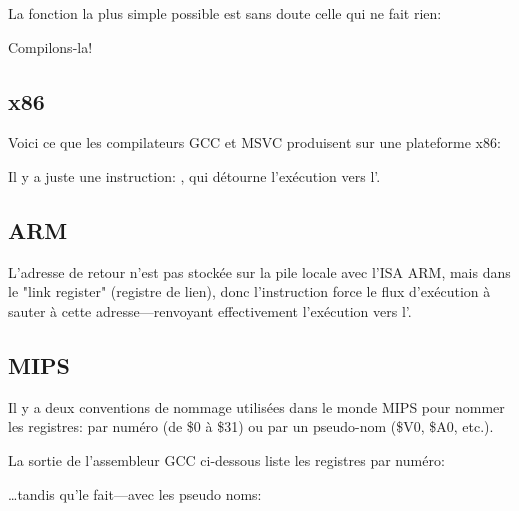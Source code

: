 ﻿
\label{empty_func}

La fonction la plus simple possible est sans doute celle qui ne fait rien:



Compilons-la!

\subsection{x86}

Voici ce que les compilateurs GCC et MSVC produisent sur une plateforme x86:



Il y a juste une instruction: \RET, qui détourne l'exécution vers l'.

\subsection{ARM}



L'adresse de retour n'est pas stockée sur la pile locale avec l'\ac{ISA} ARM, mais
dans le "link register" (registre de lien), %
donc l'instruction  force le flux d'exécution à sauter à cette adresse---renvoyant
effectivement l'exécution vers l'.

\subsection{MIPS}

Il y a deux conventions de nommage utilisées dans le monde MIPS pour nommer les registres:
par numéro (de \$0 à \$31) ou par un pseudo-nom (\$V0, \$A0, etc.).

La sortie de l'assembleur GCC ci-dessous liste les registres par numéro:



\dots tandis qu'\IDA le fait---avec les pseudo noms:



